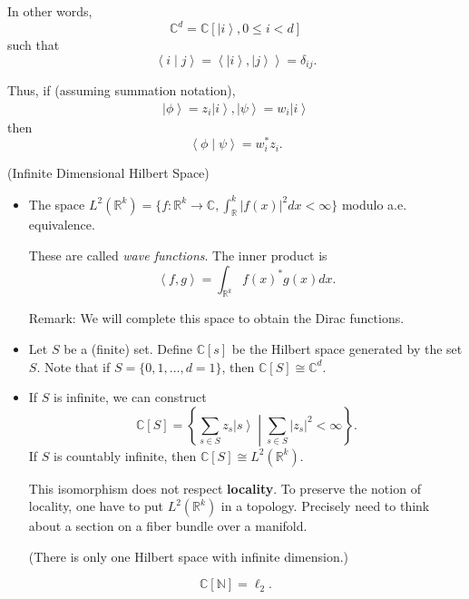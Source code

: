 In other words, 
\[
	\mathbb{C}^d = \mathbb{C}\left[ \left| i \right\rangle , 0 \le i <d \right] 
\] 
such that
\[
	\left\langle i \middle| j \right\rangle = \left\langle \left| i \right\rangle , \left| j \right\rangle  \right\rangle  = \delta_{i j}
.\] 

Thus, if (assuming summation notation),
\begin{align*}
	\left| \phi \right\rangle = z_i \left| i \right\rangle , \left| \psi \right\rangle  = w_i \left| i \right\rangle 
\end{align*}
then
\[
	\left\langle \phi \middle| \psi \right\rangle 
	= w_i^* z_i
.\] 


\begin{example}(Infinite Dimensional Hilbert Space)
	\begin{itemize}
		\item 
	The space $L^2(\mathbb{R}^k) = \{f: \mathbb{R}^k \to \mathbb{C}, \int _\mathbb{R}^k |f(x)|^2 d x < \infty \} $ modulo a.e. equivalence.

	These are called \textit{wave functions}. The inner product is
	\[
		\left\langle f, g \right\rangle  = \int _{\mathbb{R}^k} f(x)^* g(x) dx
	.\] 

	Remark: We will complete this space to obtain the Dirac functions.
\item Let $S$ be a (finite) set. Define $\mathbb{C}[s]$ be the Hilbert space generated by the set $S$. Note that if $S = \{0,1, \ldots, d = 1\} $, then $\mathbb{C}[S] \cong \mathbb{C}^d$.

\item If $S$ is infinite, we can construct
	\[
		\mathbb{C}[S] = \left\{ \sum_{s \in  S} z_s \left| s \right\rangle \middle| \sum_{s \in  S} |z_s|^2 < \infty  \right\} 
	.\] 
	If $S$ is countably infinite, then $\mathbb{C}[S] \cong L^2(\mathbb{R}^k)$.
	\begin{remark}
		This isomorphism does not respect \textbf{locality}. To preserve the notion of locality, one have to put $L^2(\mathbb{R}^k)$ in a topology. Precisely  need to think about a section on a fiber bundle over a manifold.
	\end{remark}

	(There is only one Hilbert space with infinite dimension.)
	\end{itemize}
\end{example}

\begin{notation}
	\[
		\mathbb{C}[\mathbb{N}] = \ell_2
	.\] 
\end{notation}


